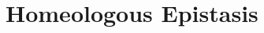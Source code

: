 \documentclass[11pt, aspectratio=169]{beamer}
\newcommand{\highlite}[1]{{\color{Carnellian} #1}}
\begin{document}
\section{Homeologous Epistasis}













\end{document}
